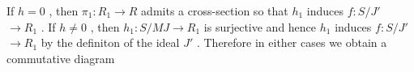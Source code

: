 \begin{center}
\end{center}
If  $h = 0$  , then  $\pi_1 : R_1 \to R$  admits a cross-section so that  $h_1$  induces $f : S/J'$ $\to R_1$  . If  $h \neq 0$  , then  $h_1 : S/MJ \to R_1$  is surjective and hence  $h_1$ induces  $f : S/J'$ $\to R_1$  by the definiton of the ideal  $J'$  . Therefore in either cases we obtain a commutative diagram


